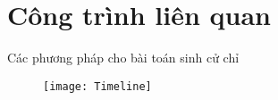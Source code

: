 \section{Công trình liên quan}

\begin{frame}{Các phương pháp cho bài toán sinh cử chỉ}

%
%			
% 
% 
\begin{figure}[width=\textwidth]
	\texttt{[image: Timeline]}
\end{figure}
\end{frame}


